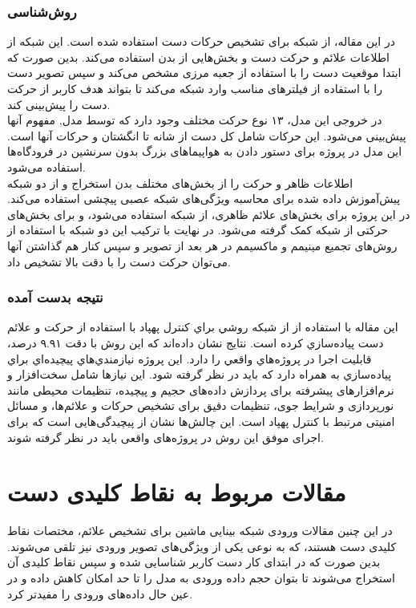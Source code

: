 \subsubsection{روش‌شناسی}
در این مقاله، از شبکه   برای تشخیص حرکات دست استفاده شده است. این شبکه از اطلاعات علائم و حرکت دست و بخش‌هایی از بدن  
استفاده می‌کند. بدین صورت که ابتدا موقعیت دست را با استفاده از جعبه مرزی مشخص می‌کند و سپس تصویر دست را با استفاده از فیلترهای مناسب وارد شبکه  می‌کند تا بتواند هدف کاربر از حرکت دست را پیش‌بینی کند.
\\
در خروجی این مدل، ۱۳ نوع حرکت مختلف وجود دارد که توسط مدل, مفهوم آنها پیش‌بینی می‌شود. این حرکات شامل کل دست از شانه تا انگشتان و حرکات آنها است. این مدل در پروژه برای دستور دادن به هواپیماهای بزرگ بدون سرنشین در فرودگاه‌ها استفاده می‌شود.
\\
 اطلاعات ظاهر و حرکت را از بخش‌های مختلف بدن استخراج و از دو شبکه پیش‌آموزش داده شده برای محاسبه ویژگی‌های شبکه عصبی پیچشی استفاده می‌کند. در این پروژه برای بخش‌های علائم ظاهری، از شبکه  استفاده می‌شود، و برای 
بخش‌های حرکتی از شبکه  کمک گرفته می‌شود.
در نهایت با ترکیب این دو شبکه با استفاده از روش‌های تجمیع مینیمم و ماکسیمم در هر بعد از تصویر و سپس کنار هم گذاشتن آنها می‌توان حرکت دست را با دقت بالا تشخیص داد.

\subsubsection{نتیجه بدست آمده}
اين مقاله با استفاده از از شبكه  روشي براي كنترل پهپاد با استفاده از حركت و علائم دست پياده‌سازي كرده است. نتايج نشان داده‌اند كه اين روش با دقت ۹.۹۱ درصد، قابليت اجرا در پروژه‌هاي واقعي را دارد.  این پروژه نيازمندي‌هاي پيچيده‌اي براي پياده‌سازي به همراه دارد كه بايد در نظر گرفته شود. این نیاز‌ها شامل سخت‌افزار و نرم‌افزار‌های پیشرفته برای پردازش داده‌های حجیم و پیچیده،
 تنظیمات محیطی مانند نورپردازی و شرایط جوی، تنظیمات دقیق برای تشخیص حرکات و علائم‌ها، و مسائل امنیتی مرتبط با کنترل پهپاد است. این چالش‌ها نشان از پیچیدگی‌هایی است که برای اجرای موفق این روش در پروژه‌های واقعی باید در نظر گرفته شوند.




\section{مقالات مربوط به نقاط کلیدی دست}
در این چنین مقالات ورودی شبکه بینایی ماشین برای تشخیص علائم، مختصات نقاط کلیدی دست هستند، که به نوعی یکی از ویژگی‌های تصویر ورودی نیز تلقی می‌شوند. بدین صورت که در ابتدای کار دست کاربر شناسایی شده و سپس نقاط کلیدی آن استخراج می‌شوند تا بتوان حجم داده ورودی به مدل را تا حد امکان کاهش داده و در عین حال داده‌های ورودی را مفیدتر کرد.

